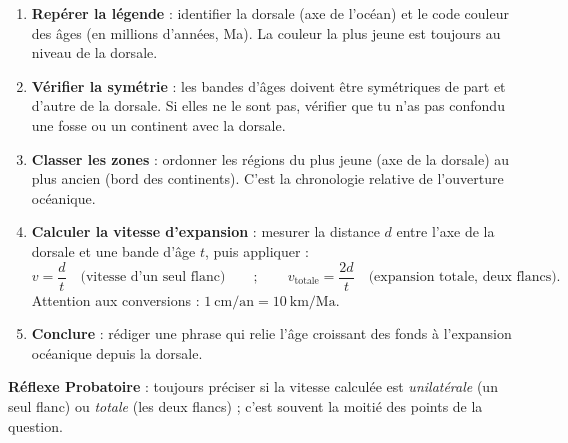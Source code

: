 \documentclass[11pt]{article}
\newcommand{\cle}[1]{{\popxbold\color{popdark}#1}}
\begin{document}
\begin{methode}
\begin{enumerate}
\item \textbf{Repérer la légende} : identifier la dorsale (axe de l'océan) et le code couleur des âges (en millions d'années, Ma). La couleur la plus jeune est toujours au niveau de la dorsale.
\item \textbf{Vérifier la symétrie} : les bandes d'âges doivent être \cle{symétriques} de part et d'autre de la dorsale. Si elles ne le sont pas, vérifier que tu n'as pas confondu une fosse ou un continent avec la dorsale.
\item \textbf{Classer les zones} : ordonner les régions du plus jeune (axe de la dorsale) au plus ancien (bord des continents). C'est la \cle{chronologie relative} de l'ouverture océanique.
\item \textbf{Calculer la vitesse d'expansion} : mesurer la distance $d$ entre l'axe de la dorsale et une bande d'âge $t$, puis appliquer :
\[ v = \dfrac{d}{t} \quad \text{(vitesse d'un seul flanc)} \qquad ; \qquad v_{\text{totale}} = \dfrac{2d}{t} \quad \text{(expansion totale, deux flancs)}. \]
Attention aux conversions : $1\ \text{cm/an} = 10\ \text{km/Ma}$.
\item \textbf{Conclure} : rédiger une phrase qui relie l'âge croissant des fonds à l'expansion océanique depuis la dorsale.
\end{enumerate}
\textbf{Réflexe Probatoire} : toujours préciser si la vitesse calculée est \emph{unilatérale} (un seul flanc) ou \emph{totale} (les deux flancs) ; c'est souvent la moitié des points de la question.
\end{methode}
\end{document}
